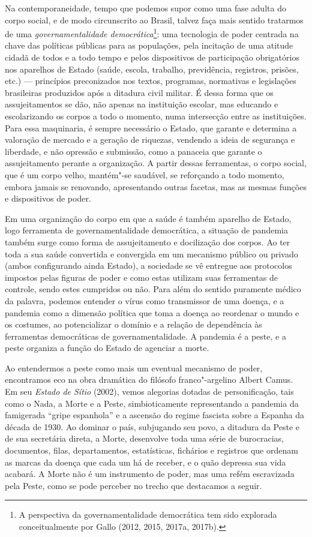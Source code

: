 Na contemporaneidade, tempo que podemos supor como uma fase adulta do
corpo social, e de modo circunscrito ao Brasil, talvez faça mais sentido
tratarmos de uma \emph{governamentalidade democrática}\footnote{A
  perspectiva da governamentalidade democrática tem sido explorada
  conceitualmente por Gallo (2012, 2015, 2017a, 2017b).}: uma tecnologia
de poder centrada na chave das políticas públicas para as populações,
pela incitação de uma atitude cidadã de todos e a todo tempo e pelos
dispositivos de participação obrigatórios nos aparelhos de Estado
(saúde, escola, trabalho, previdência, registros, prisões, etc.) ---
princípios preconizados nos textos, programas, normativas e legislações
brasileiras produzidos após a ditadura civil militar. É dessa forma que
os assujeitamentos se dão, não apenas na instituição escolar, mas
educando e escolarizando os corpos a todo o momento, numa intersecção
entre as instituições. Para essa maquinaria, é sempre necessário o
Estado, que garante e determina a valoração de mercado e a geração de
riquezas, vendendo a ideia de segurança e liberdade, e não opressão e
submissão, como a panaceia que garante o assujeitamento perante a
organização. A partir dessas ferramentas, o corpo social, que é um corpo
velho, mantém"-se saudável, se reforçando a todo momento, embora jamais
se renovando, apresentando outras facetas, mas as mesmas funções e
dispositivos de poder.

Em uma organização do corpo em que a saúde é também aparelho de Estado,
logo ferramenta de governamentalidade democrática, a situação de
pandemia também surge como forma de assujeitamento e docilização dos
corpos. Ao ter toda a sua saúde convertida e convergida em um mecanismo
público ou privado (ambos configurando ainda Estado), a sociedade se vê
entregue aos protocolos impostos pelas figuras de poder e como estas
utilizam suas ferramentas de controle, sendo estes cumpridos ou não.
Para além do sentido puramente médico da palavra, podemos entender o
vírus como transmissor de uma doença, e a pandemia como a dimensão
política que toma a doença ao reordenar o mundo e os costumes, ao
potencializar o domínio e a relação de dependência às ferramentas
democráticas de governamentalidade. A pandemia é a peste, e a peste
organiza a função do Estado de agenciar a morte.

Ao entendermos a peste como mais um eventual mecanismo de poder,
encontramos eco na obra dramática do filósofo franco"-argelino Albert
Camus. Em seu \emph{Estado de Sítio} (2002), vemos alegorias dotadas de
personificação, tais como o Nada, a Morte e a Peste, simbioticamente
representando a pandemia da famigerada ``gripe espanhola'' e a ascensão
do regime fascista sobre a Espanha da década de 1930. Ao dominar o país,
subjugando seu povo, a ditadura da Peste e de sua secretária direta, a
Morte, desenvolve toda uma série de burocracias, documentos, filas,
departamentos, estatísticas, fichários e registros que ordenam as marcas
da doença que cada um há de receber, e o quão depressa sua vida acabará.
A Morte não é um instrumento de poder, mas uma refém escravizada pela
Peste, como se pode perceber no trecho que destacamos a seguir.

